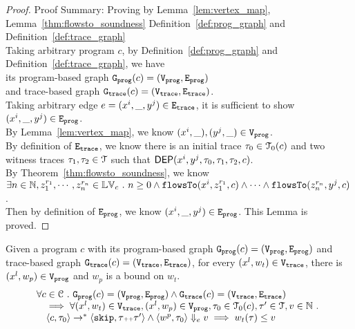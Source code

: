 \begin{proof}
Proof Summary: Proving by Lemma~\ref{lem:vertex_map}, Lemma~\ref{thm:flowsto_soundness} Definition~\ref{def:prog_graph} and Definition~\ref{def:trace_graph}
\\
Taking arbitrary program $c$,
by Definition~\ref{def:prog_graph} and Definition~\ref{def:trace_graph}, 
we have   
\\
its program-based graph $\mathtt{{G_{prog}}}({c}) = (\mathtt{{V_{prog}}}, \mathtt{{E_{prog}}})$ 
\\
and 
trace-based graph $\mathtt{{G_{trace}}}({c}) = (\mathtt{{V_{trace}}}, \mathtt{{E_{trace}}})$.
\\
Taking arbitrary edge $e = (x^i, \_, y^j) \in \mathtt{{E_{trace}}}$, it is sufficient to show $(x^i,  \_, y^j) \in \mathtt{{E_{prog}}}$.
\\
By Lemma~\ref{lem:vertex_map}, we know $(x^i, \_), (y^j, \_) \in \mathtt{{V_{prog}}}$.
\\
By definition of $\mathtt{{E_{trace}}}$, we know there is an initial trace $\mathtt{\tau}_0 \in \mathcal{T}_0(c)$ and 
two witness traces $\mathtt{\tau}_1, \mathtt{\tau}_2 \in \mathcal{T}$
such that $\mathsf{DEP}(x^i, y^j, \mathtt{\tau}_0, \mathtt{\tau}_1, \mathtt{\tau}_2, c)$.
\\
By Theorem~\ref{thm:flowsto_soundness}, we know $ \exists n \in \mathbb{N}, z_1^{r_1}, \cdots, z_n^{r_n} \in \mathbb{LV}_{{c}} ~.~ 
n \geq 0 \land
\mathtt{flowsTo}(x^i,  z_1^{r_1}, c) 
\land \cdots \land \mathtt{flowsTo}(z_n^{r_n}, y^j, c) $.
\\
Then by definition of $\mathtt{{E_{prog}}}$, we know $(x^i, \_, y^j) \in \mathtt{{E_{prog}}}$. This Lemma is proved.
\end{proof}
%
\begin{lem}
	\label{lem:vertexweights_map}
	Given a program $c$ with its
	program-based graph $\mathtt{{G_{prog}}}({c}) = (\mathtt{{V_{prog}}}, \mathtt{{E_{prog}}})$
	and 
	trace-based graph $\mathtt{{G_{trace}}}({c}) = (\mathtt{{V_{trace}}}, \mathtt{{E_{trace}}})$,
	for every $(x^l, w_{t}) \in \mathtt{{V_{trace}}}$, there is $(x^l, w_{p}) \in \mathtt{{V_{prog}}}$ and 
	$w_{p}$ is a bound on $w_t$.
	\[
		\begin{array}{l}
			\forall c \in \mathcal{C} 
			 ~.~ 
			 \mathtt{{G_{prog}}}({c}) = (\mathtt{{V_{prog}}}, \mathtt{{E_{prog}}})
			\land 
			\mathtt{{G_{trace}}}({c}) = (\mathtt{{V_{trace}}}, \mathtt{{E_{trace}}})
			\\ \quad
			\implies
			\forall (x^l, w_{t}) \in \mathtt{{V_{trace}}},
			(x^l, w_{p}) \in \mathtt{{V_{prog}}}, 
			\mathtt{\tau}_0 \in \mathcal{T}_0(c), 
			\mathtt{\tau}' \in \mathcal{T}, v \in \mathbb{N} ~.~
			\\ \quad
			\langle {c}, \mathtt{\tau}_0 \rangle \to^{*} \langle \mathtt{skip}, \mathtt{\tau}{\scriptscriptstyle ++}\mathtt{\tau}' \rangle 
			\land 
			\langle w^{p}, \mathtt{\tau}_0 \rangle \Downarrow_e v
			\implies
			w_{t}(\mathtt{\tau}) \leq v
		\end{array}
		\]
	\end{lem}
